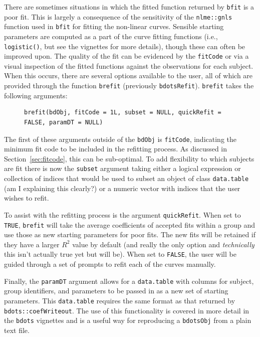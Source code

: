 \documentclass{article}
\newcommand{\xt}{\texttt}%
\begin{document}
There are sometimes situations in which the fitted function returned by \texttt{bfit} is a poor fit. This is largely a consequence of the sensitivity of the \xt{nlme::gnls} function used in \xt{bfit} for fitting the non-linear curves. Sensible starting parameters are computed as a part of the curve fitting functions (i.e., \xt{logistic()}, but see the vignettes for more details), though these can often be improved upon. The quality of the fit can be evidenced by the \texttt{fitCode} or via a visual inspection of the fitted functions against the observations for each subject.  When this occurs, there are several options available to the user, all of which are provided through the function \texttt{brefit} (previously \texttt{bdotsRefit}). \texttt{brefit} takes the following arguments:

\begin{singlespace}
\begin{figure}[H]
\centering
\begin{BVerbatim}
brefit(bdObj, fitCode = 1L, subset = NULL, quickRefit = FALSE, paramDT = NULL)
\end{BVerbatim}
\end{figure}
\end{singlespace}

The first of these arguments outside of the \xt{bdObj} is \xt{fitCode}, indicating the minimum fit code to be included in the refitting process. As discussed in Section~\ref{sec:fitcode}, this can be sub-optimal. To add flexibility to which subjects are fit there is now the \xt{subset} argument taking either a logical expression or collection of indices that would be used to subset an object of class \xt{data.table} (am I explaining this clearly?) or a numeric vector with indices that the user wishes to refit.

To assist with the refitting process is the argument \xt{quickRefit}. When set to \xt{TRUE}, \xt{brefit} will take the average coefficients of accepted fits within a group and use those as new starting parameters for poor fits. The new fits will be retained if they have a larger $R^2$ value by default (and really the only option and \textit{technically} this isn't actually true yet but will be). When set to \xt{FALSE}, the user will be guided through a set of prompts to refit each of the curves manually.

Finally, the \texttt{paramDT} argument allows for a \xt{data.table} with columns for subject, group identifiers, and parameters to be passed in as a new set of starting parameters. This \xt{data.table} requires the same format as that returned by \xt{bdots::coefWriteout}. The use of this functionality is covered in more detail in the \xt{bdots} vignettes and is a useful way for reproducing a \xt{bdotsObj} from a plain text file. 
\end{document}
